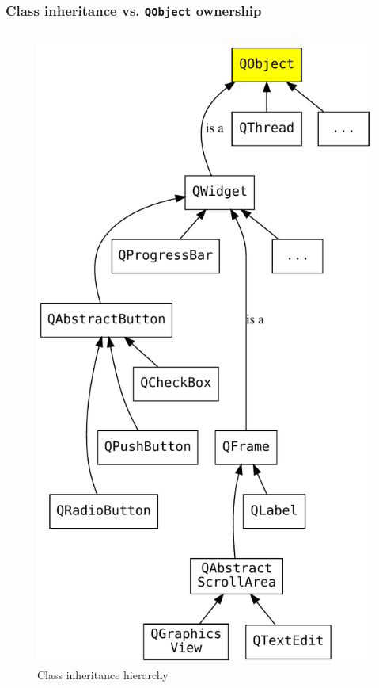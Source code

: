 \begin{frame}
  \frametitle{Class inheritance vs. \texttt{QObject} ownership}
  \begin{columns}
    \begin{column}{0.47\textwidth}
    \begin{figure}[!t]
    \centering
    \includegraphics[height=0.72\textheight]{images/class_tree.pdf}
    \caption{\footnotesize Class inheritance hierarchy}

\end{figure}
\end{column}
\end{columns}
\end{frame}
